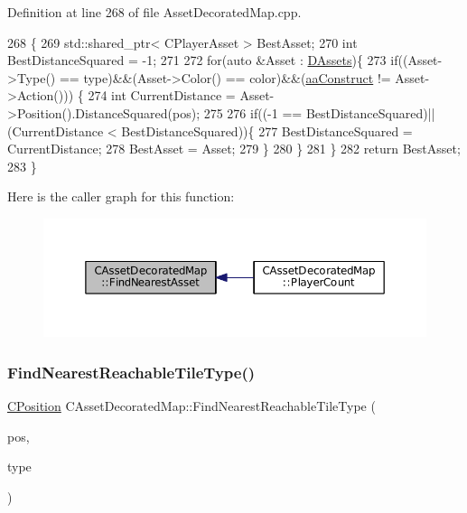 Definition at line 268 of file Asset\+Decorated\+Map.\+cpp.


\begin{DoxyCode}
268                                                                                                            
                    \{
269     std::shared\_ptr< CPlayerAsset > BestAsset;
270     \textcolor{keywordtype}{int} BestDistanceSquared = -1;
271     
272     \textcolor{keywordflow}{for}(\textcolor{keyword}{auto} &Asset : \hyperlink{classCAssetDecoratedMap_a94eeed5b16141169b1ba6cb3842055aa}{DAssets})\{
273         \textcolor{keywordflow}{if}((Asset->Type() == type)&&(Asset->Color() == color)&&(\hyperlink{GameDataTypes_8h_ab47668e651a3032cfb9c40ea2d60d670a7ef6b863f66dd7dcc95a199cd758ae1d}{aaConstruct} != Asset->Action()))
      \{
274             \textcolor{keywordtype}{int} CurrentDistance = Asset->Position().DistanceSquared(pos);
275             
276             \textcolor{keywordflow}{if}((-1 == BestDistanceSquared)||(CurrentDistance < BestDistanceSquared))\{
277                 BestDistanceSquared = CurrentDistance;
278                 BestAsset = Asset;
279             \}
280         \}
281     \}
282     \textcolor{keywordflow}{return} BestAsset;
283 \}
\end{DoxyCode}
Here is the caller graph for this function\+:
\nopagebreak
\begin{figure}[H]
\begin{center}
\leavevmode
\includegraphics[width=350pt]{classCAssetDecoratedMap_a37f9ffaf70ea515c422544a52dd80483_icgraph}
\end{center}
\end{figure}
\hypertarget{classCAssetDecoratedMap_a9e9eed95b427443d196b56b852cdeb9d}{}\label{classCAssetDecoratedMap_a9e9eed95b427443d196b56b852cdeb9d} 
\subsubsection{\texorpdfstring{Find\+Nearest\+Reachable\+Tile\+Type()}{FindNearestReachableTileType()}}
{\footnotesize\ttfamily \hyperlink{classCPosition}{C\+Position} C\+Asset\+Decorated\+Map\+::\+Find\+Nearest\+Reachable\+Tile\+Type (\begin{DoxyParamCaption}\item[{const \hyperlink{classCPosition}{C\+Position} \&}]{pos,  }\item[{\hyperlink{classCTerrainMap_aff2ab991e237269941416dd79d8871d4}{E\+Tile\+Type}}]{type }\end{DoxyParamCaption})}



